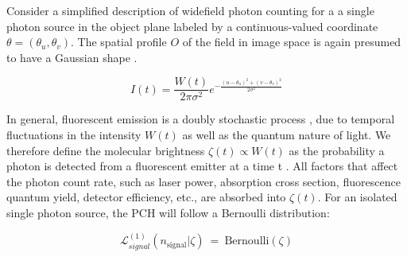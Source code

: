 Consider a simplified description of widefield photon counting for a a single photon source in the object plane labeled by a continuous-valued coordinate $\theta=(\theta_u,\theta_v)$. The spatial profile $O$ of the field in image space is again presumed to have a Gaussian shape \parencite{Zhang2007,Richards1959,Gibson1989}. 

\begin{equation}
I(t)=\frac{W(t)}{2\pi\sigma^2}e^{-\frac{\left(u-\theta_u\right)^2+\left(v-\theta_v\right)^2}{2\sigma^2}}  
\end{equation}

In general, fluorescent emission is a doubly stochastic process \parencite{Chen1999}, due to temporal fluctuations in the intensity $W(t)$ as well as the quantum nature of light. We therefore define the molecular brightness $\zeta(t)\propto W(t)$ as the probability a photon is detected from a fluorescent emitter at a time t . All factors that affect the photon count rate, such as laser power, absorption cross section, fluorescence quantum yield, detector efficiency, etc., are absorbed into $\zeta(t)$. For an isolated single photon source, the PCH will follow a Bernoulli distribution: 




\begin{equation}
\mathcal{L}_{signal}^{(1)}(n_{\mathrm{signal}}\lvert\zeta)\ =\ \mathrm{Bernoulli}(\zeta)
\end{equation}

